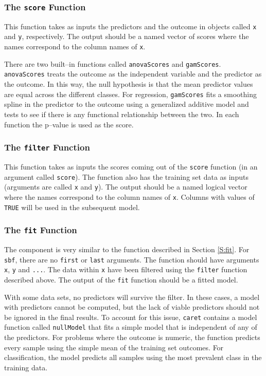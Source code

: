 \documentclass[12pt]{article}
\begin{document}
\subsubsection{The \texttt{score} Function}\label{S:filter}

This function takes as inputs the predictors and the outcome in
objects called \texttt{x} and \texttt{y}, respectively. The output
should be a named vector of scores where the names correspond to the
column names of \texttt{x}. 

There are two built--in functions called \texttt{anovaScores} and
\texttt{gamScores}. \texttt{anovaScores} treats the outcome as the
independent variable and the predictor as the outcome. In this way,
the null hypothesis is that the mean predictor values are equal across
the different classes. For regression, \texttt{gamScores} fits a smoothing spline in
the predictor to the outcome  using a generalized additive model and tests to see if there is any
functional relationship between the two. In each function the
p--value is used as the score.

\subsubsection{The \texttt{filter} Function}\label{S:filter}

This function takes as inputs the scores coming out of the
\texttt{score} function (in an argument called \texttt{score}). The
function also has the training set data as inputs (arguments are called \texttt{x} and \texttt{y}). 
The output
should be a named logical vector where the names correspond to the
column names of \texttt{x}. Columns with values of \texttt{TRUE} will
be used in the subsequent model.


\subsubsection{The \texttt{fit} Function}

The component is very similar to the function described in Section
\ref{S:fit}. For \texttt{sbf}, there are no \texttt{first} or
\texttt{last} arguments. The function should have arguments
\texttt{x}, \texttt{y} and \texttt{...}. The data within \texttt{x}
have been filtered using the \texttt{filter} function described
above. The output of the \texttt{fit} function should be a fitted model.


With some data sets, no predictors will survive the filter. In these cases, a model with predictors cannot be computed, but the lack of viable predictors should not be ignored in the final results. To account for this issue, \texttt{caret} contains a model function called \texttt{nullModel} that fits a simple model that is independent of any of the predictors. For problems where the outcome is numeric, the function predicts every sample using the simple mean of the training set outcomes. For classification, the model predicts all samples using the most prevalent class in the training data.
\end{document}
